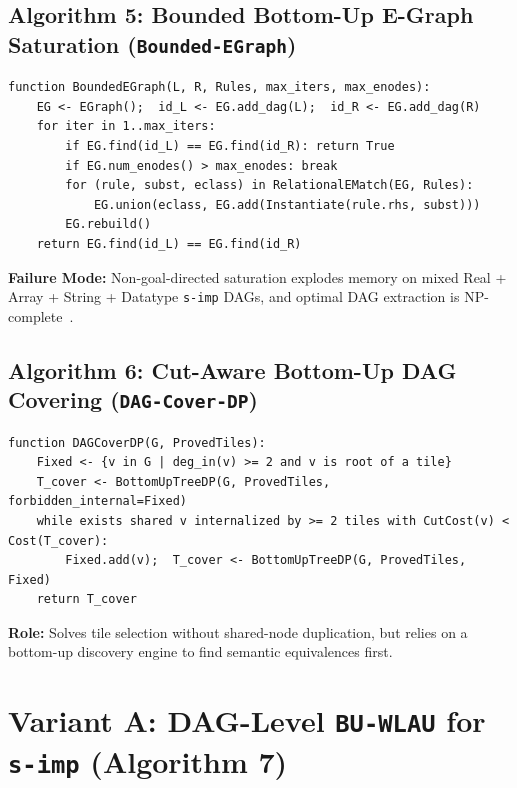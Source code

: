 \documentclass[11pt,a4paper]{article}
\begin{document}
\subsection{Algorithm 5: Bounded Bottom-Up E-Graph Saturation (\texttt{Bounded-EGraph})}
\begin{lstlisting}[caption={Algorithm 5: Bounded Bottom-Up E-Graph Saturation (\texttt{Bounded-EGraph}).}]
function BoundedEGraph(L, R, Rules, max_iters, max_enodes):
    EG <- EGraph();  id_L <- EG.add_dag(L);  id_R <- EG.add_dag(R)
    for iter in 1..max_iters:
        if EG.find(id_L) == EG.find(id_R): return True
        if EG.num_enodes() > max_enodes: break
        for (rule, subst, eclass) in RelationalEMatch(EG, Rules):
            EG.union(eclass, EG.add(Instantiate(rule.rhs, subst)))
        EG.rebuild()
    return EG.find(id_L) == EG.find(id_R)
\end{lstlisting}
\textbf{Failure Mode:} Non-goal-directed saturation explodes memory on mixed Real + Array + String + Datatype \texttt{s-imp} DAGs, and optimal DAG extraction is NP-complete~\cite{zhang2023extract}.

\subsection{Algorithm 6: Cut-Aware Bottom-Up DAG Covering (\texttt{DAG-Cover-DP})}
\begin{lstlisting}[caption={Algorithm 6: Cut-Aware Bottom-Up DAG Covering (\texttt{DAG-Cover-DP}).}]
function DAGCoverDP(G, ProvedTiles):
    Fixed <- {v in G | deg_in(v) >= 2 and v is root of a tile}
    T_cover <- BottomUpTreeDP(G, ProvedTiles, forbidden_internal=Fixed)
    while exists shared v internalized by >= 2 tiles with CutCost(v) < Cost(T_cover):
        Fixed.add(v);  T_cover <- BottomUpTreeDP(G, ProvedTiles, Fixed)
    return T_cover
\end{lstlisting}
\textbf{Role:} Solves tile selection without shared-node duplication, but relies on a bottom-up discovery engine to find semantic equivalences first.

\section{Variant A: DAG-Level \texttt{BU-WLAU} for \texttt{s-imp} (Algorithm 7)}
\label{sec:proposed}
\end{document}

